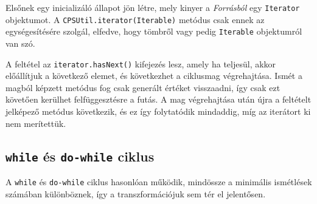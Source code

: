 Elsőnek egy inicializáló állapot jön létre, mely kinyer a \textit{Forrásból} egy \texttt{Iterator} objektumot. A \texttt{CPSUtil.iterator(Iterable)} metódus csak ennek az egységesítésére szolgál, elfedve, hogy tömbről vagy pedig \texttt{Iterable} objektumról van szó. 

A feltétel az \texttt{iterator.hasNext()} kifejezés lesz, amely ha teljesül, akkor előállítjuk a következő elemet, és következhet a ciklusmag végrehajtása. Ismét a magból képzett metódus fog csak generált értéket visszaadni, így csak ezt követően kerülhet felfüggesztésre a futás. A mag végrehajtása után újra a feltételt jelképező metódus következik, és ez így folytatódik mindaddig, míg az iterátort ki nem merítettük.

\subsection{\texttt{while} és \texttt{do-while} ciklus}

A \texttt{while} és \texttt{do-while} ciklus hasonlóan működik, mindössze a minimális ismétlések számában különböznek, így a transzformációjuk sem tér el jelentősen.

